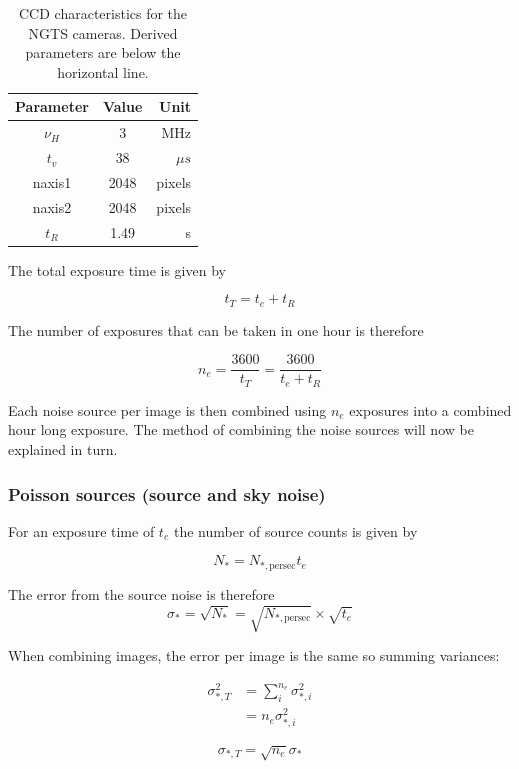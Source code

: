 \documentclass[a4paper]{report}
\begin{document}
\begin{table}
    \centering
    \begin{tabular}{ccr}
        \toprule
        Parameter & Value & Unit \\
        \midrule
        $\nu_H$ & $3$ & MHz \\
        $t_v$ & $38$ &  $\mu s$ \\
        naxis1 & 2048 & pixels \\
        naxis2 & 2048 & pixels \\
        \midrule
        $t_R$ & 1.49 & s \\
        \bottomrule
    \end{tabular}
    \caption{CCD characteristics for the NGTS cameras. Derived
    parameters are below the horizontal line.}
    \label{tab:ccdparams}
\end{table}

The total exposure time is given by 

\[
    t_T = t_e + t_R
    \]


The number of exposures that can be taken in one hour is therefore 

\[
    n_{e} = \frac{3600}{t_T} = \frac{3600}{t_e + t_R}
    \]

Each noise source per image is then combined using $n_e$ exposures into
a combined hour long exposure. The method of combining the  noise sources 
will now be explained in turn.

\subsubsection{Poisson sources (source and sky noise)}

For an exposure time of $t_e$ the number of source counts is given by

\[
    N_{\ast} = N_{\ast,\mathrm{per sec}} t_e
    \]

The error from the source noise is therefore
\[
    \sigma_{\ast} = \sqrt{N_{\ast}} = \sqrt{N_{\ast,\mathrm{per sec}}}
    \times \sqrt{t_e}
    \]

When combining images, the error per image is the same so summing
variances:

\begin{align*}
    \sigma_{\ast,T}^2 &= \sum_i^{n_{e}} \sigma_{\ast,i}^2 \\
        & = n_{e} \sigma_{\ast,i}^2
\end{align*}

\[
    \sigma_{\ast, T} = \sqrt{n_{e}} \sigma_{\ast}
    \]
\end{document}
